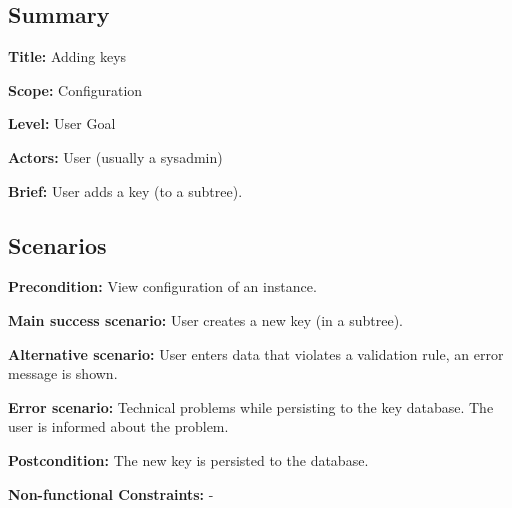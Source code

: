 \subsection*{Summary}


\begin{DoxyItemize}
\item {\bfseries Title\+:} Adding keys
\item {\bfseries Scope\+:} Configuration
\item {\bfseries Level\+:} User Goal
\item {\bfseries Actors\+:} User (usually a sysadmin)
\item {\bfseries Brief\+:} User adds a key (to a subtree).
\end{DoxyItemize}

\subsection*{Scenarios}


\begin{DoxyItemize}
\item {\bfseries Precondition\+:} View configuration of an instance.
\item {\bfseries Main success scenario\+:} User creates a new key (in a subtree).
\item {\bfseries Alternative scenario\+:} User enters data that violates a validation rule, an error message is shown.
\item {\bfseries Error scenario\+:} Technical problems while persisting to the key database. The user is informed about the problem.
\item {\bfseries Postcondition\+:} The new key is persisted to the database.
\item {\bfseries Non-\/functional Constraints\+:} -\/ 
\end{DoxyItemize}